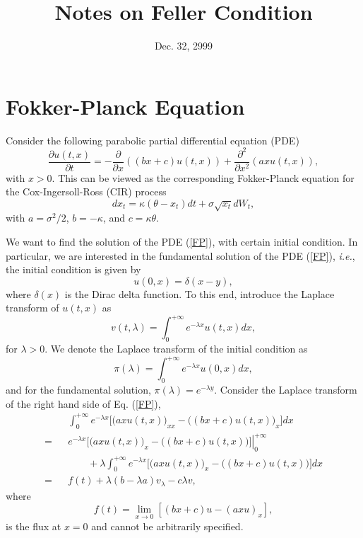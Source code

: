 \documentclass[12pt]{article}
\begin{document}
\title{Notes on Feller Condition}
\date{Dec. 32, 2999}

\maketitle

\section{Fokker-Planck Equation}

  Consider the following parabolic partial differential equation (PDE) \cite{Feller}
  \begin{equation}
    \frac{\partial u(t,x)}{\partial t} = -\frac{\partial}{\partial x}\left((bx+c)u(t,x)\right)
                                       + \frac{\partial^2}{\partial x^2}\left(axu(t,x)\right),
    \label{FP}
  \end{equation}
  with $x>0$. This can be viewed as the corresponding Fokker-Planck equation for the Cox-Ingersoll-Ross (CIR)
  process
  \begin{equation}
    dx_t=\kappa(\theta-x_t)dt + \sigma\sqrt{x_t}dW_t,
  \end{equation}
  with $a=\sigma^2/2$, $b=-\kappa$, and $c=\kappa\theta$.

  We want to find the solution of the PDE (\ref{FP}), with certain initial condition. In particular, we are 
  interested in the fundamental solution of the PDE (\ref{FP}), {\it i.e.}, the initial condition is given
  by
  \begin{equation}
    u(0,x)=\delta(x-y),
  \end{equation}
  where $\delta(x)$ is the Dirac delta function. To this end, introduce the Laplace transform of $u(t,x)$ as
  \begin{equation}
    v(t,\lambda)=\int_0^{+\infty}e^{-\lambda x}u(t,x)dx,
  \end{equation}
  for $\lambda > 0$. We denote the Laplace transform of the initial condition as
  \begin{equation}
    \pi(\lambda) = \int_0^{+\infty}e^{-\lambda x}u(0,x)dx,
  \end{equation} 
  and for the fundamental solution, $\pi(\lambda) = e^{-\lambda y}$. Consider the Laplace transform of the right hand side of Eq. (\ref{FP}),
  \begin{eqnarray}
      && \int_0^{+\infty} e^{-\lambda x}\bigg[\big(axu(t,x)\big)_{xx}-\big((bx+c)u(t,x)\big)_x\bigg]dx \nonumber\\
    = && \left. e^{-\lambda x}\bigg[\big(axu(t,x)\big)_{x}-\big((bx+c)u(t,x)\big)\bigg]\right|_0^{+\infty}\nonumber\\
      && \quad\quad +\lambda \int_0^{+\infty} e^{-\lambda x}\bigg[\big(axu(t,x)\big)_{x}-\big((bx+c)u(t,x)\big)\bigg]dx \nonumber\\
    = && f(t) + \lambda(b-\lambda a)v_{\lambda} - c\lambda v,
  \end{eqnarray}
  where
  \begin{equation}
    f(t) = \lim_{x\rightarrow 0}\left[(bx+c)u-(axu)_x\right],
  \end{equation}
  is the flux at $x=0$ and cannot be arbitrarily specified.
\end{document}
